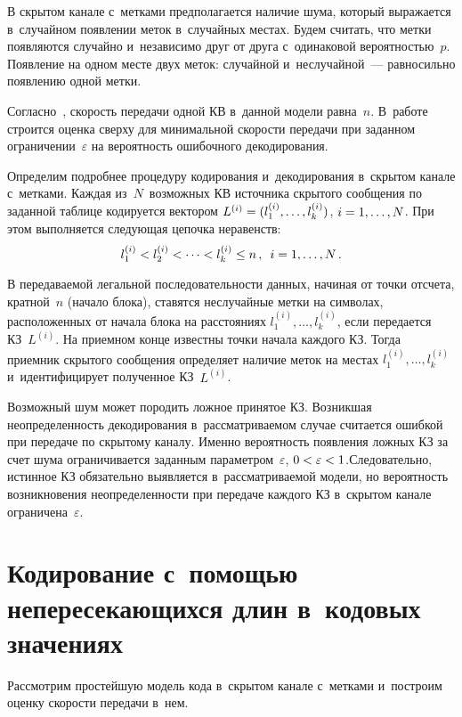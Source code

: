 \begin{multicols}{2}
  В скрытом канале с~метками предполагается наличие шума, который 
выражается в~случайном появлении меток в~случайных местах. Будем считать, 
что метки появляются случайно и~независимо друг от друга с~одинаковой 
вероятностью~$p$. Появление на одном месте двух меток: случайной и~неслучайной~--- 
равносильно появлению одной метки. 
  
  Согласно~\cite{6-gru}, скорость передачи одной КВ в~данной модели 
равна~$n$. В~работе строится оценка сверху для минимальной ско\-рости 
передачи при заданном ограничении~$\varepsilon$ на вероятность ошибочного 
декодирования. 
  
  Определим подробнее процедуру кодирования и~декодирования в~скрытом 
канале с~метками. Каж\-дая из~$N$~возможных КВ источника скрытого 
сообщения по заданной таблице кодируется вектором $L^{(i)} \hm= (l_1^{(i)}, 
\ldots, l_k^{(i)})$, $i\hm= 1,\ldots, N$. При этом выполняется следующая 
цепочка неравенств:
  $$
  l_1^{(i)}<l_2^{(i)}<\cdots <l_k^{(i)} \leq n\,,\enskip i=1,\ldots, N\,.
  $$
  
  В передаваемой легальной последовательности данных, начиная от точки 
отсчета, кратной~$n$ (начало блока), ставятся неслучайные метки на символах, 
расположенных от начала блока на расстояниях $l_1^{(i)},\ldots, l_k^{(i)}$, 
если передается КЗ~$L^{(i)}$. На приемном конце известны точки начала 
каждого КЗ. Тогда приемник скрытого сообщения определяет наличие меток на 
местах $l_1^{(i)},\ldots, l_k^{(i)}$ и~идентифицирует полученное КЗ~$L^{(i)}$. 
  
  Возможный шум может породить ложное принятое КЗ. Возникшая 
неопределенность декодирования в~рассматриваемом случае считается 
ошибкой при передаче по скрытому каналу. Именно вероятность появления 
ложных КЗ за счет шума ограничивается заданным параметром~$\varepsilon$, 
\mbox{$0\hm< \varepsilon\hm< 1$.}\linebreak Следовательно, истинное КЗ обязательно 
выявляется в~рассматриваемой модели, но вероятность возникновения 
неопределенности при передаче каж\-до\-го КЗ в~скрытом канале 
ограничена~$\varepsilon$. 
  
\section{Кодирование с~помощью непересекающихся длин 
в~кодовых значениях}

  Рассмотрим простейшую модель кода в~скрытом канале с~метками 
и~построим оценку скорости передачи в~нем. 
  

\end{multicols}
